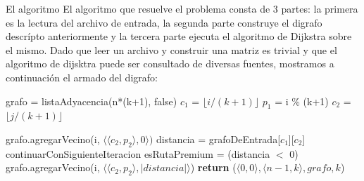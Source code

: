 \begin{subsection}{El algoritmo}
El algoritmo que resuelve el problema consta de 3 partes: la primera es la lectura del archivo de entrada, la segunda parte construye el digrafo descr\'{i}pto anteriormente y la tercera parte ejecuta el algoritmo de Dijkstra sobre el mismo. Dado que leer un archivo y construir una matriz es trivial y que el algoritmo de dijsktra puede ser consultado de diversas fuentes, mostramos a continuación el armado del digrafo:

\begin{algorithm}[H]
  \begin{algorithmic}[1]
    \State 	grafo = listaAdyacencia(n*(k+1), false)
      
		\State $c_1$ = $\lfloor i / (k+1)\rfloor$ 
        \State $p_1$ =  i \% (k+1)
        	\State $c_2$ = $\lfloor j / (k+1)\rfloor$ 
     
    \end{algorithmic}
\end{algorithm}

\begin{algorithm}[H]
	\begin{algorithmic}[1]
        
            \State grafo.agregarVecino(i, $\langle \langle c_2,p_2 \rangle, 0\rangle)$
            \Else
            	\State distancia = grafoDeEntrada[$c_1$][$c_2$]  
                 continuarConSiguienteIteracion 
                \EndIIf {}
                \State esRutaPremium = (distancia $<$ 0) 
					\State grafo.agregarVecino(i, $\langle \langle c_2,p_2 \rangle, |distancia| \rangle$) 
                 \EndIf
            \EndIf
            \EndFor
      \EndFor
      \State \textbf{return} ($\langle 0,0\rangle, \langle n-1, k \rangle, grafo, k$)
    \EndFunction    
  \end{algorithmic}
\end{algorithm}

\end{subsection}

